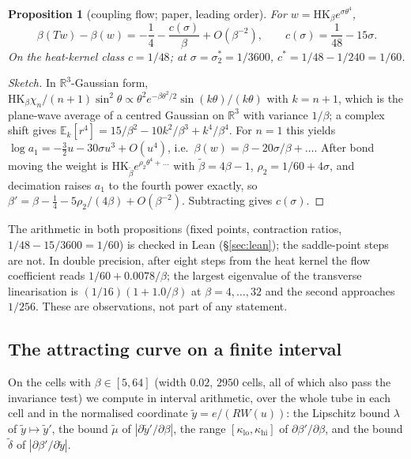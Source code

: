 \documentclass[11pt,a4paper]{article}
\newtheorem{proposition}[theorem]{Proposition}
\theoremstyle{definition}
\theoremstyle{remark}
\newcommand{\R}{\mathbb{R}}
\newcommand{\HK}{\mathrm{HK}}
\begin{document}
\begin{proposition}[coupling flow; paper, leading order]\label{prop:cstar}
For $w=\HK_\beta e^{\sigma\theta^4}$,
\[
\beta(Tw)-\beta(w)=-\frac14-\frac{c(\sigma)}{\beta}+O(\beta^{-2}),\qquad c(\sigma)=\frac1{48}-15\sigma .
\]
On the heat-kernel class $c=1/48$; at $\sigma=\sigma_2^*=1/3600$, $c^*=1/48-1/240=1/60$.
\end{proposition}
\begin{proof}[Sketch]
In $\R^3$-Gaussian form, $\HK_\beta\chi_n/(n+1)\sin^2\theta\propto\theta^2e^{-\beta\theta^2/2}\sin(k\theta)/(k\theta)$ with $k=n+1$, which is the plane-wave average of a centred Gaussian on $\R^3$ with variance $1/\beta$; a complex shift gives $\mathbb{E}_k[r^4]=15/\beta^2-10k^2/\beta^3+k^4/\beta^4$.
For $n=1$ this yields $\log a_1=-\tfrac32u-30\sigma u^3+O(u^4)$, i.e.\ $\beta(w)=\beta-20\sigma/\beta+\dots$.
After bond moving the weight is $\HK_{\tilde\beta}e^{\rho_2\theta^4+\dots}$ with $\tilde\beta=4\beta-1$, $\rho_2=1/60+4\sigma$, and decimation raises $a_1$ to the fourth power exactly, so $\beta'=\beta-\tfrac14-5\rho_2/(4\beta)+O(\beta^{-2})$.
Subtracting gives $c(\sigma)$.
\end{proof}
The arithmetic in both propositions (fixed points, contraction ratios, $1/48-15/3600=1/60$) is checked in Lean (\S\ref{sec:lean}); the saddle-point steps are not.
In double precision, after eight steps from the heat kernel the flow coefficient reads $1/60+0.0078/\beta$; the largest eigenvalue of the transverse linearisation is $(1/16)(1+1.0/\beta)$ at $\beta=4,\dots,32$ and the second approaches $1/256$.
These are observations, not part of any statement.

\subsection{The attracting curve on a finite interval}
On the cells with $\beta\in[5,64]$ (width $0.02$, $2950$ cells, all of which also pass the invariance test) we compute in interval arithmetic, over the whole tube in each cell and in the normalised coordinate $\tilde y=e/(RW(u))$: the Lipschitz bound $\lambda$ of $\tilde y\mapsto\tilde y'$, the bound $\tilde\mu$ of $|\partial\tilde y'/\partial\beta|$, the range $[\kappa_{\mathrm{lo}},\kappa_{\mathrm{hi}}]$ of $\partial\beta'/\partial\beta$, and the bound $\tilde\delta$ of $|\partial\beta'/\partial\tilde y|$.
\end{document}
